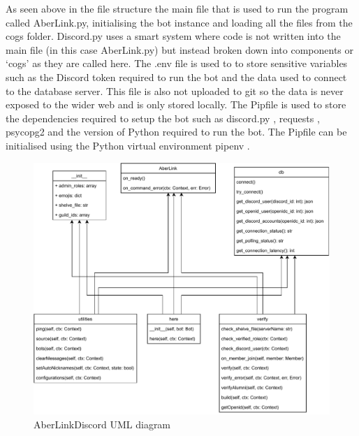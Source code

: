 As seen above in the file structure the main file that is used to run the program called AberLink.py, initialising the bot instance and loading all the files from the cogs folder. Discord.py \cite{discord.py} uses a smart system where code is not written into the main file (in this case AberLink.py) but instead broken down into components or `cogs' as they are called here. The .env file is used to to store sensitive variables such as the Discord token required to run the bot and the data used to connect to the database server. This file is also not uploaded to git so the data is never exposed to the wider web and is only stored locally. The Pipfile is used to store the dependencies required to setup the bot such as discord.py \cite{discord.py}, requests \cite{requests}, psycopg2 \cite{psycopg2} and the version of Python required to run the bot. The Pipfile can be initialised using the Python virtual environment pipenv \cite{pipenv}.

\begin{figure}[H]
	\centering
	\includegraphics[width=1\linewidth]{Figures/discord-uml}
	\caption{AberLinkDiscord UML diagram}
	\label{fig:discord-uml}
\end{figure}

